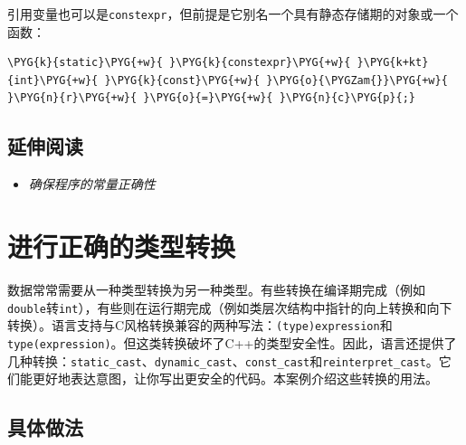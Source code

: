 
引用变量也可以是\texttt{constexpr}，但前提是它别名一个具有静态存储期的对象或一个函数：



\begin{codeblockbg}
\begin{Verbatim}[commandchars=\\\{\},breaklines=true,breakanywhere=true,fontsize=\codefont,xleftmargin=17bp]
\PYG{k}{static}\PYG{+w}{ }\PYG{k}{constexpr}\PYG{+w}{ }\PYG{k+kt}{int}\PYG{+w}{ }\PYG{k}{const}\PYG{+w}{ }\PYG{o}{\PYGZam{}}\PYG{+w}{ }\PYG{n}{r}\PYG{+w}{ }\PYG{o}{=}\PYG{+w}{ }\PYG{n}{c}\PYG{p}{;}
\end{Verbatim}
\end{codeblockbg}



\subsection{延伸阅读}



\begin{itemize}
\item \textit{确保程序的常量正确性}

\end{itemize}



\section{进行正确的类型转换}



数据常常需要从一种类型转换为另一种类型。有些转换在编译期完成（例如\texttt{double}转\texttt{int}），有些则在运行期完成（例如类层次结构中指针的向上转换和向下转换）。语言支持与C风格转换兼容的两种写法：\texttt{(\allowbreak{}type)\allowbreak{}expression}和\texttt{type(\allowbreak{}expression)}。但这类转换破坏了C++的类型安全性。因此，语言还提供了几种转换：\texttt{static\_\allowbreak{}cast}、\texttt{dynamic\_\allowbreak{}cast}、\texttt{const\_\allowbreak{}cast}和\texttt{reinterpret\_\allowbreak{}cast}。它们能更好地表达意图，让你写出更安全的代码。本案例介绍这些转换的用法。



\subsection{具体做法}


